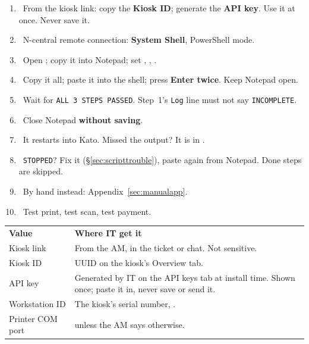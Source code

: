 \documentclass[a4paper,10pt]{article}
\begin{document}
\begin{center}
\begin{minipage}[t]{0.475\textwidth}
\begin{enumerate}[leftmargin=6mm,itemsep=3pt]
  \item \emptybox\ From the kiosk link: copy the \textbf{Kiosk ID};
        generate the \textbf{API key}. Use it at once. Never save it.
  \item \emptybox\ N-central remote connection: \textbf{System Shell},
        PowerShell mode.
  \item \emptybox\ Open ; copy it into Notepad;
        set , , .
  \item \emptybox\ Copy it all; paste it into the shell; press
        \textbf{Enter twice}. Keep Notepad open.
  \item \emptybox\ Wait for \texttt{ALL 3 STEPS PASSED}. Step~1's
        \texttt{Log} line must not say \texttt{INCOMPLETE}.
  \item \emptybox\ Close Notepad \textbf{without saving}.
  \item \emptybox\ It restarts into Kato. Missed the output? It is in
        .
  \item \emptybox\ \texttt{STOPPED}? Fix it (\S\ref{sec:scripttrouble}),
        paste again from Notepad. Done steps are skipped.
  \item \emptybox\ By hand instead: Appendix~\ref{sec:manualapp}.
  \item \emptybox\ Test print, test scan, test payment.
\end{enumerate}
\end{minipage}
\end{center}

\vspace{6pt}

\begin{center}
\renewcommand{\arraystretch}{1.2}\footnotesize
\begin{tabularx}{\textwidth}{L{34mm} X}
\color{white}\textbf{Value} &
\color{white}\textbf{Where IT get it}\\
Kiosk link & From the AM, in the ticket or chat. Not sensitive.\\
Kiosk ID & UUID on the kiosk's Overview tab.\\
API key & Generated by IT on the API keys tab at install time. Shown once;
paste it in, never save or send it.\\
Workstation ID & The kiosk's serial number, .\\
Printer COM port &  unless the AM says otherwise.\\
\end{tabularx}
\end{center}
\end{document}
